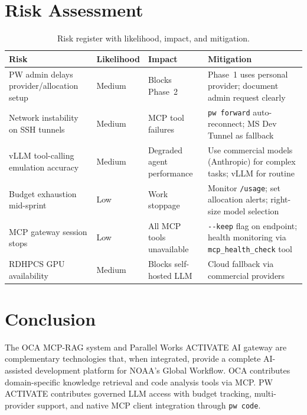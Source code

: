 \documentclass[11pt,letterpaper,twoside]{article}
\begin{document}
\section{Risk Assessment}
\label{sec:risk}

\begin{table}[H]
\centering\small
\caption{Risk register with likelihood, impact, and mitigation.}
\label{tab:risk}
\begin{tabularx}{\textwidth}{L{5.8cm} L{1.7cm} L{2.2cm} X}
\toprule
\textbf{Risk} & \textbf{Likelihood} & \textbf{Impact} & \textbf{Mitigation} \\
\midrule
PW admin delays provider/allocation setup & Medium & Blocks Phase~2 & Phase~1 uses personal provider; document admin request clearly \\
\addlinespace
Network instability on SSH tunnels & Medium & MCP tool failures & \texttt{pw forward} auto-reconnect; MS Dev Tunnel as fallback \\
\addlinespace
vLLM tool-calling emulation accuracy & Medium & Degraded agent performance & Use commercial models (Anthropic) for complex tasks; vLLM for routine \\
\addlinespace
Budget exhaustion mid-sprint & Low & Work stoppage & Monitor \texttt{/usage}; set allocation alerts; right-size model selection \\
\addlinespace
MCP gateway session stops & Low & All MCP tools unavailable & \texttt{-{}-keep} flag on endpoint; health monitoring via \texttt{mcp\_health\_check} tool \\
\addlinespace
RDHPCS GPU availability & Medium & Blocks self-hosted LLM & Cloud fallback via commercial providers \\
\bottomrule
\end{tabularx}
\end{table}

\section{Conclusion}
\label{sec:conclusion}

The OCA MCP-RAG system and Parallel Works ACTIVATE AI gateway are
complementary technologies that, when integrated, provide a complete
AI-assisted development platform for NOAA's Global Workflow. OCA contributes
domain-specific knowledge retrieval and code analysis tools via MCP. PW
ACTIVATE contributes governed LLM access with budget tracking,
multi-provider support, and native MCP client integration through
\texttt{pw code}.
\end{document}
